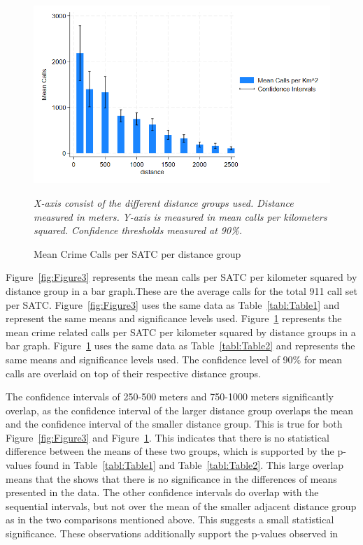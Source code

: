 \documentclass[12pt]{article}
\begin{document}
\begin{figure}[htbp]
    \centering
\includegraphics[width=0.75\linewidth]{Reproducibility Package/Visual Graphics/Crime_CI_Graph.png}
    \caption{Mean Crime Calls per SATC per distance group}
    \label{fig:Figure4}
        \textit{X-axis consist of the different distance groups used. Distance measured in meters.}
    \textit{Y-axis is measured in mean calls per kilometers squared.}
     \textit{Confidence thresholds measured at 90\%.}
\end{figure}

Figure~\ref{fig:Figure3} represents the mean calls per SATC per kilometer squared by distance group in a bar graph.These are the average calls for the total 911 call set per SATC. Figure~\ref{fig:Figure3} uses the same data as Table~\ref{tabl:Table1} and represent the same means and significance levels used. Figure~\ref{fig:Figure4} represents the mean crime related calls per SATC per kilometer squared by distance groups in a bar graph. Figure~\ref{fig:Figure4} uses the same data as Table~\ref{tabl:Table2} and represents the same means and significance levels used. The confidence level of 90\% for mean calls are overlaid on top of their respective distance groups. 

The confidence intervals of 250-500 meters and 750-1000 meters significantly overlap, as the confidence interval of the larger distance group overlaps the mean and the confidence interval of the smaller distance group. This is true for both Figure~\ref{fig:Figure3} and Figure~\ref{fig:Figure4}. This indicates that there is no statistical difference between the means of these two groups, which is supported by the p-values found in Table~\ref{tabl:Table1} and Table~\ref{tabl:Table2}. This large overlap means that the shows that there is no significance in the differences of means presented in the data. The other confidence intervals do overlap with the sequential intervals, but not over the mean of the smaller adjacent distance group as in the two comparisons mentioned above. This suggests a small statistical significance. These observations additionally support the p-values observed in 
\end{document}
